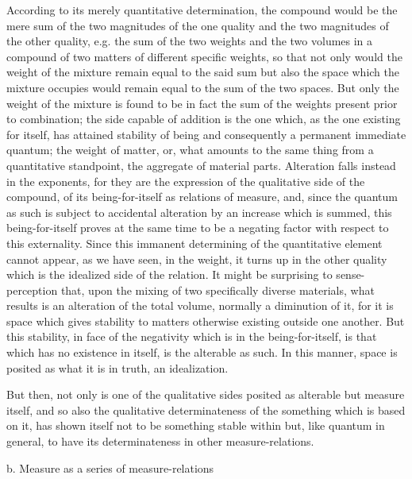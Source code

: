 According to its merely quantitative determination,
the compound would be the mere sum
of the two magnitudes of the one quality
and the two magnitudes of the other quality,
e.g. the sum of the two weights
and the two volumes in a compound of two matters
of different specific weights, so that not only
would the weight of the mixture remain equal to the said sum
but also the space which the mixture occupies
would remain equal to the sum of the two spaces.
But only the weight of the mixture is found
to be in fact the sum of the weights present prior to combination;
the side capable of addition is the one which,
as the one existing for itself,
has attained stability of being
and consequently a permanent immediate quantum;
the weight of matter, or, what amounts to the same thing from
a quantitative standpoint, the aggregate of material parts.
Alteration falls instead in the exponents,
for they are the expression of the qualitative side of the compound,
of its being-for-itself as relations of measure,
and, since the quantum as such is subject
to accidental alteration by an increase which is summed,
this being-for-itself proves at the same time to be
a negating factor with respect to this externality.
Since this immanent determining of the quantitative element
cannot appear, as we have seen, in the weight,
it turns up in the other quality
which is the idealized side of the relation.
It might be surprising to sense-perception
that, upon the mixing of two specifically diverse materials,
what results is an alteration of the total volume,
normally a diminution of it,
for it is space which gives stability to matters
otherwise existing outside one another.
But this stability, in face of the negativity
which is in the being-for-itself,
is that which has no existence in itself,
is the alterable as such.
In this manner, space is posited as what it is in truth,
an idealization.

But then, not only is one of the qualitative sides
posited as alterable but measure itself,
and so also the qualitative determinateness
of the something which is based on it,
has shown itself not to be something stable within
but, like quantum in general, to have
its determinateness in other measure-relations.

b. Measure as a series of measure-relations

